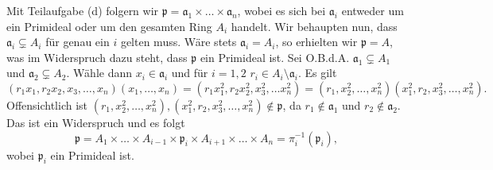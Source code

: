 \documentclass{article}
\begin{document}
\begin{enumerate}[(a)]
        Mit Teilaufgabe (d) folgern wir $\mathfrak{p} = \mathfrak{a}_1 \times \dots \times \mathfrak{a}_n$, wobei es sich bei $\mathfrak{a}_i$ entweder um ein Primideal oder um den gesamten Ring $A_i$ handelt.
        Wir behaupten nun, dass $\mathfrak{a}_i \subsetneq A_i$ für genau ein $i$ gelten muss.
        Wäre stets $\mathfrak{a}_i = A_i$, so erhielten wir $\mathfrak{p} = A$, was im Widerspruch dazu steht, dass $\mathfrak{p}$ ein Primideal ist.
        Sei O.B.d.A. $\mathfrak{a}_1 \subsetneq A_1$ und $\mathfrak{a}_2 \subsetneq A_2$. Wähle dann $x_i \in \mathfrak{a}_i$ und für $i = 1,2$ $r_i \in A_i \setminus \mathfrak{a}_i$. Es gilt
        \[
            (r_1x_1, r_2x_2, x_3, \dots, x_n) (x_1, \dots, x_n) = (r_1x_1^2, r_2x_2^2,x_3^2,\dots x_n^2) = (r_1, x_2^2, \dots, x_n^2) (x_1^2, r_2, x_3^2, \dots, x_n^2).  
        \]
        Offensichtlich ist $(r_1, x_2^2, \dots, x_n^2),  (x_1^2, r_2, x_3^2, \dots, x_n^2) \notin \mathfrak{p}$, da $r_1 \notin \mathfrak{a}_1$ und $r_2 \notin \mathfrak{a}_2$.
        Das ist ein Widerspruch und es folgt 
        \[ 
            \mathfrak{p} = A_1 \times \dots \times A_{i-1} \times \mathfrak{p}_i \times A_{i+1} \times \dots \times A_n = \pi_i^{-1}(\mathfrak{p}_i)
            ,
        \]
        wobei $\mathfrak{p}_i$ ein Primideal ist.
    \end{enumerate}
\end{document}

